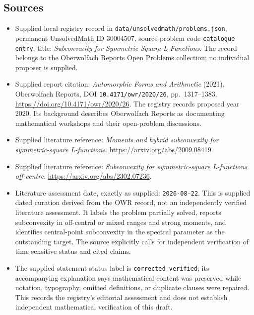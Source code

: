 \documentclass[11pt]{article}
\begin{document}
\subsection{Sources}
\begin{itemize}
\item Supplied local registry record in \texttt{data/unsolvedmath/problems.json}, permanent UnsolvedMath ID \(30004507\), source problem code \texttt{catalogue entry}, title: \emph{Subconvexity for Symmetric-Square L-Functions}. The record belongs to the Oberwolfach Reports Open Problems collection; no individual proposer is supplied.
\item Supplied report citation: \emph{Automorphic Forms and Arithmetic} (2021), Oberwolfach Reports, DOI \texttt{10.4171/owr/2020/26}, pp.~1317--1383. \url{https://doi.org/10.4171/owr/2020/26}. The registry records proposed year 2020. Its background describes Oberwolfach Reports as documenting mathematical workshops and their open-problem discussions.
\item Supplied literature reference: \emph{Moments and hybrid subconvexity for symmetric-square L-functions}. \url{https://arxiv.org/abs/2009.08419}.
\item Supplied literature reference: \emph{Subconvexity for symmetric-square L-functions off-centre}. \url{https://arxiv.org/abs/2302.07236}.
\item Literature assessment date, exactly as supplied: \texttt{2026-08-22}. This is supplied dated curation derived from the OWR record, not an independently verified literature assessment. It labels the problem partially solved, reports subconvexity in off-central or mixed ranges and strong moments, and identifies central-point subconvexity in the spectral parameter as the outstanding target. The source explicitly calls for independent verification of time-sensitive status and cited claims.
\item The supplied statement-status label is \texttt{corrected\_verified}; its accompanying explanation says mathematical content was preserved while notation, typography, omitted definitions, or duplicate clauses were repaired. This records the registry's editorial assessment and does not establish independent mathematical verification of this draft.
\end{itemize}
\end{document}
